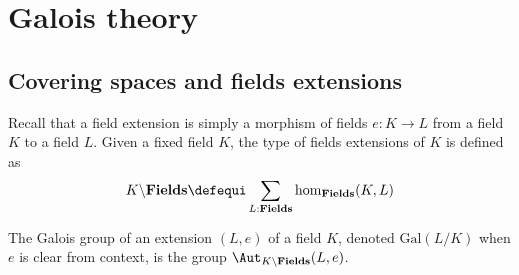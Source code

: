 \chapter{Galois theory}%
\label{chap:galois-theory}%



\section{Covering spaces and fields extensions}
\label{sec:cover-spac-fields}

\def\fieldstype{\mathbf{Fields}}%
\def\Gal{\mathrm{Gal}}%
\def\fieldshom{\hom_{\fieldstype}}%
\def\isHom{\mathrm{isHom}}%
\def\iso{\mathrm{Iso}}%
\newcommand\fieldsext[1]{#1\backslash\fieldstype}%
Recall that a field extension is simply a morphism of fields $e: K\to L$ from a
field $K$ to a field $L$. Given a fixed field $K$, the type of fields
extensions of $K$ is defined as
\begin{displaymath}
  \fieldsext K \defequi \sum_{L:\fieldstype}\fieldshom(K,L)
\end{displaymath}

\begin{definition}
  The Galois group of an extension $(L,e)$ of a field $K$, denoted $\Gal(L/K)$ when $e$ is clear from context,
  is the group
  $\Aut_{\fieldsext K}{(L,e)}$.
  \label{def:galois-group}
\end{definition}

